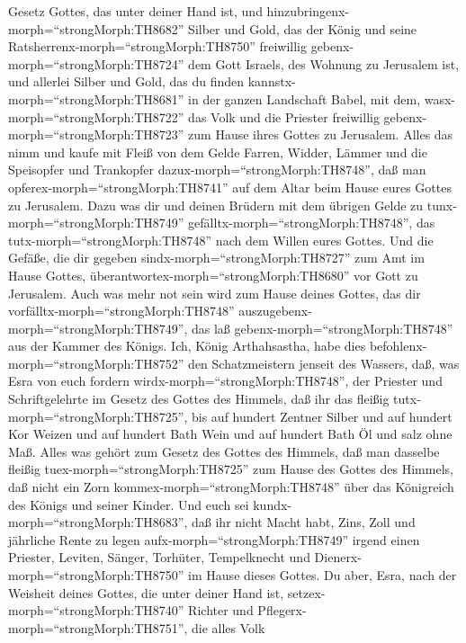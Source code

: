 Gesetz Gottes, das unter deiner Hand ist,  und
hinzubringenx-morph=``strongMorph:TH8682'' Silber und Gold, das der
König und seine Ratsherrenx-morph=``strongMorph:TH8750'' freiwillig
gebenx-morph=``strongMorph:TH8724'' dem Gott Israels, des Wohnung zu
Jerusalem ist,  und allerlei Silber und Gold, das du finden
kannstx-morph=``strongMorph:TH8681'' in der ganzen Landschaft Babel, mit
dem, wasx-morph=``strongMorph:TH8722'' das Volk und die Priester
freiwillig gebenx-morph=``strongMorph:TH8723'' zum Hause ihres Gottes zu
Jerusalem.  Alles das nimm und kaufe mit Fleiß von dem
Gelde Farren, Widder, Lämmer und die Speisopfer und Trankopfer
dazux-morph=``strongMorph:TH8748'', daß man
opferex-morph=``strongMorph:TH8741'' auf dem Altar beim Hause eures
Gottes zu Jerusalem.  Dazu was dir und deinen Brüdern mit
dem übrigen Gelde zu tunx-morph=``strongMorph:TH8749''
gefälltx-morph=``strongMorph:TH8748'', das
tutx-morph=``strongMorph:TH8748'' nach dem Willen eures Gottes.
 Und die Gefäße, die dir gegeben
sindx-morph=``strongMorph:TH8727'' zum Amt im Hause Gottes,
überantwortex-morph=``strongMorph:TH8680'' vor Gott zu Jerusalem.
 Auch was mehr not sein wird zum Hause deines Gottes, das
dir vorfälltx-morph=``strongMorph:TH8748''
auszugebenx-morph=``strongMorph:TH8749'', das laß
gebenx-morph=``strongMorph:TH8748'' aus der Kammer des Königs.
 Ich, König Arthahsastha, habe dies
befohlenx-morph=``strongMorph:TH8752'' den Schatzmeistern jenseit des
Wassers, daß, was Esra von euch fordern
wirdx-morph=``strongMorph:TH8748'', der Priester und Schriftgelehrte im
Gesetz des Gottes des Himmels, daß ihr das fleißig
tutx-morph=``strongMorph:TH8725'',  bis auf hundert Zentner
Silber und auf hundert Kor Weizen und auf hundert Bath Wein und auf
hundert Bath Öl und salz ohne Maß.  Alles was gehört zum
Gesetz des Gottes des Himmels, daß man dasselbe fleißig
tuex-morph=``strongMorph:TH8725'' zum Hause des Gottes des Himmels, daß
nicht ein Zorn kommex-morph=``strongMorph:TH8748'' über das Königreich
des Königs und seiner Kinder.  Und euch sei
kundx-morph=``strongMorph:TH8683'', daß ihr nicht Macht habt, Zins, Zoll
und jährliche Rente zu legen aufx-morph=``strongMorph:TH8749'' irgend
einen Priester, Leviten, Sänger, Torhüter, Tempelknecht und
Dienerx-morph=``strongMorph:TH8750'' im Hause dieses Gottes.
 Du aber, Esra, nach der Weisheit deines Gottes, die unter
deiner Hand ist, setzex-morph=``strongMorph:TH8740'' Richter und
Pflegerx-morph=``strongMorph:TH8751'', die alles Volk
